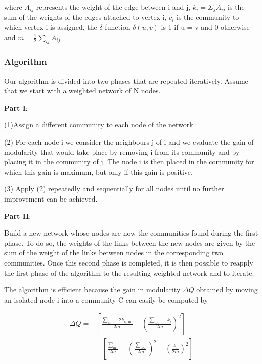 \documentclass[fleqn,10pt]{SelfArx} %
\begin{document}
	where $A_{ij}$ represents the weight of the edge between i and j, $k_i = \Sigma_{j} A_{ij}$ is the sum of the weights of the edges attached to vertex i, $c_i$ is the community to which vertex i is assigned, the $\delta$ function $\delta(u, v)$ is 1 if u = v and 0 otherwise and $m=\frac{1}{2} \sum_{i j} A_{i j}$
	
	\subsubsection{Algorithm}
	
	Our algorithm is divided into two phases that are repeated iteratively. Assume that we start with a weighted network of N nodes.
	
	\noindent
	\textbf{Part I}:
	
	\noindent
	(1)Assign a different community to each node of the network
	
	\noindent
	(2) For each node i we consider the neighbours j of i and we evaluate
	the gain of modularity that would take place by removing i from its community and by placing it in the community of j. The node i is then placed in the community for which this gain is maximum, but only if this gain is positive.
	
	\noindent
	(3) Apply (2) repeatedly and sequentially for all nodes until no further improvement can be achieved.
	
	\noindent
	\textbf{Part II}:
	
	\noindent
	Build a new network whose nodes are now the communities found during the first phase. To do so, the weights of the links between the new nodes are given by the sum of the weight of the links between nodes
	in the corresponding two communities. Once this second phase is
	completed, it is then possible to reapply the first phase of the algorithm to the resulting weighted network and to iterate.
	
	The algorithm is efficient because the gain in modularity $\Delta Q$ obtained by moving an isolated node i into a community C can easily be computed by
	
	\begin{small}
	\begin{equation}
		\begin{split}
			\Delta Q=&\left[\frac{\sum_{\text {in }}+2 k_{i, \text { in }}}{2 m}-\left(\frac{\sum_{\text {tot }}+k_{i}}{2 m}\right)^{2}\right]\\
			&-\left[\frac{\sum_{\text {in }}}{2 m}-\left(\frac{\sum_{\text {tot }}}{2 m}\right)^{2}-\left(\frac{k_{i}}{2 m}\right)^{2}\right]
		\end{split}
	\end{equation}
	\end{small}
	
\end{document}
